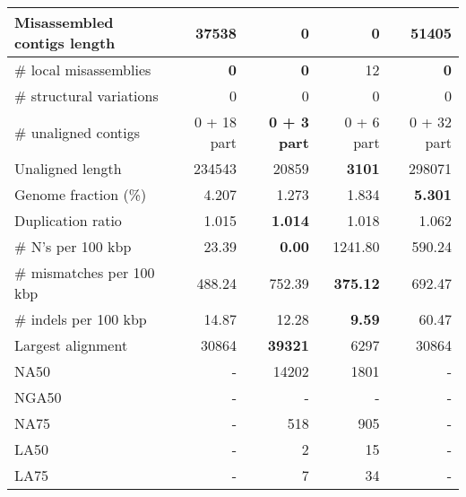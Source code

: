 \documentclass[12pt,a4paper]{article}
\begin{document}
\begin{table}[ht]
\begin{center}
\begin{tabular}{|l*{4}{|r}|}
Misassembled contigs length & 37538 & {\bf 0} & {\bf 0} & 51405 \\ \hline
\# local misassemblies & {\bf 0} & {\bf 0} & 12 & {\bf 0} \\ \hline
\# structural variations & 0 & 0 & 0 & 0 \\ \hline
\# unaligned contigs & 0 + 18 part & {\bf 0 + 3 part} & 0 + 6 part & 0 + 32 part \\ \hline
Unaligned length & 234543 & 20859 & {\bf 3101} & 298071 \\ \hline
Genome fraction (\%) & 4.207 & 1.273 & 1.834 & {\bf 5.301} \\ \hline
Duplication ratio & 1.015 & {\bf 1.014} & 1.018 & 1.062 \\ \hline
\# N's per 100 kbp & 23.39 & {\bf 0.00} & 1241.80 & 590.24 \\ \hline
\# mismatches per 100 kbp & 488.24 & 752.39 & {\bf 375.12} & 692.47 \\ \hline
\# indels per 100 kbp & 14.87 & 12.28 & {\bf 9.59} & 60.47 \\ \hline
Largest alignment & 30864 & {\bf 39321} & 6297 & 30864 \\ \hline
NA50 & - & 14202 & 1801 & - \\ \hline
NGA50 & - & - & - & - \\ \hline
NA75 & - & 518 & 905 & - \\ \hline
LA50 & - & 2 & 15 & - \\ \hline
LA75 & - & 7 & 34 & - \\ \hline
\end{tabular}
\end{center}
\end{table}
\end{document}
